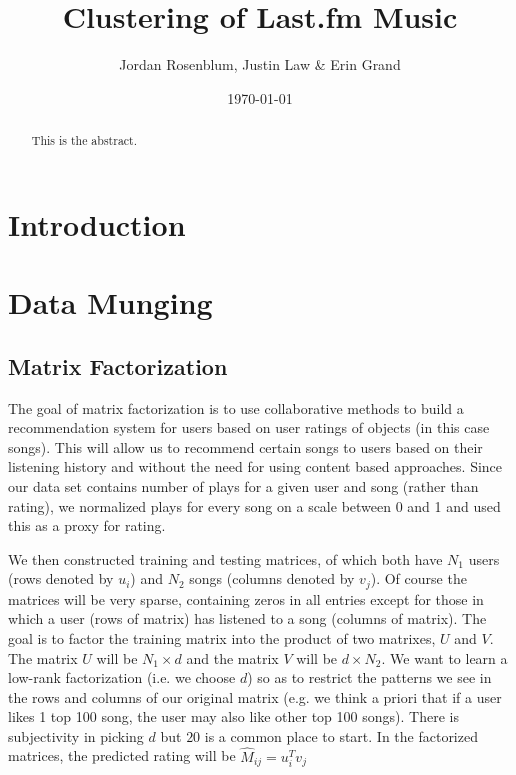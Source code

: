 \documentclass[12pt,preprint]{aastex}
\newcommand{\TRANSPOSE}{\ensuremath{T}}
\begin{document}
\title{Clustering of Last.fm Music}

 \author{Jordan Rosenblum, Justin Law \& Erin Grand}
 
\date{\today}             

\begin{abstract}
This is the abstract. 
\end{abstract}

\tableofcontents

\section{Introduction}

\section{Data Munging}

\subsection{Matrix Factorization}
The goal of matrix factorization is to use collaborative methods to build a recommendation system for users based on user ratings of objects (in this case songs). This will allow us to recommend certain songs to users based on their listening history and without the need for using content based approaches. Since our data set contains number of plays for a given user and song (rather than rating), we normalized plays for every song on a scale between 0 and 1 and used this as a proxy for rating. 


We then constructed training and testing matrices, of which both have $N_1$ users (rows denoted by $u_i$) and $N_2$ songs (columns denoted by $v_j$). Of course the matrices will be very sparse, containing zeros in all entries except for those in which a user (rows of matrix) has listened to a song (columns of matrix). The goal is to factor the training matrix into the product of two matrixes, $U$ and $V$. The matrix $U$ will be $N_1 \times d$ and the matrix $V$ will be $d \times N_2$. We want to learn a low-rank factorization (i.e. we choose $d$) so as to restrict the patterns we see in the rows and columns of our original matrix (e.g. we think a priori that if a user likes 1 top 100 song, the user may also like other top 100 songs). There is subjectivity in picking $d$ but $20$ is a common place to start. In the factorized matrices, the predicted rating will be $\hat{M}_{ij} = u_i^\TRANSPOSE  v_j$ 
\end{document}
